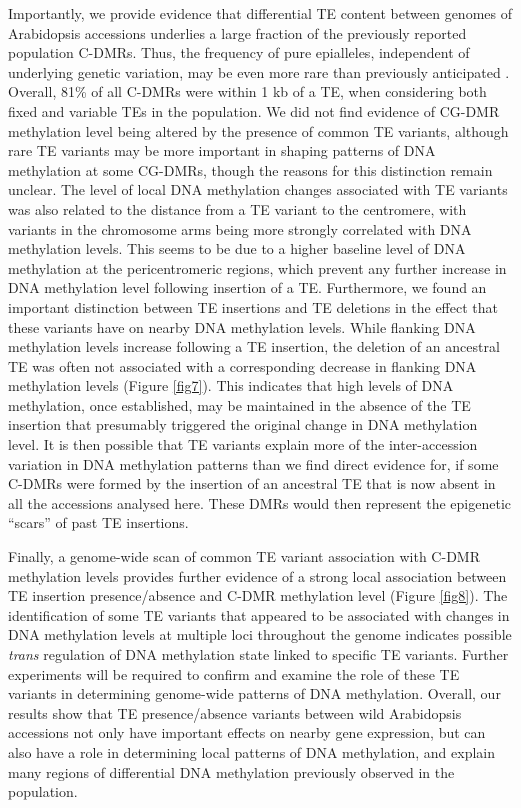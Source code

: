 \documentclass[12pt]{article}
\begin{document}
Importantly, we provide evidence that differential TE content between
genomes of Arabidopsis accessions underlies a large fraction of the
previously reported population C-DMRs. Thus, the frequency of pure
epialleles, independent of underlying genetic variation, may be even
more rare than previously anticipated \cite{Richards:2006br}. Overall,
81\% of all C-DMRs were within 1 kb of a TE, when considering both fixed
and variable TEs in the population. We did not find evidence of CG-DMR
methylation level being altered by the presence of common TE variants,
although rare TE variants may be more important in shaping patterns of
DNA methylation at some CG-DMRs, though the reasons for this distinction
remain unclear. The level of local DNA methylation changes associated
with TE variants was also related to the distance from a TE variant to
the centromere, with variants in the chromosome arms being more strongly
correlated with DNA methylation levels. This seems to be due to a higher
baseline level of DNA methylation at the pericentromeric regions, which
prevent any further increase in DNA methylation level following
insertion of a TE. Furthermore, we found an important distinction
between TE insertions and TE deletions in the effect that these variants
have on nearby DNA methylation levels. While flanking DNA methylation
levels increase following a TE insertion, the deletion of an ancestral
TE was often not associated with a corresponding decrease in flanking
DNA methylation levels (Figure \ref{fig7}). This indicates that high levels of
DNA methylation, once established, may be maintained in the absence of
the TE insertion that presumably triggered the original change in DNA
methylation level. It is then possible that TE variants explain more of
the inter-accession variation in DNA methylation patterns than we find
direct evidence for, if some C-DMRs were formed by the insertion of an
ancestral TE that is now absent in all the accessions analysed here.
These DMRs would then represent the epigenetic ``scars'' of past TE
insertions.

Finally, a genome-wide scan of common TE variant association with
C-DMR methylation levels provides further evidence of a strong local
association between TE insertion presence/absence and C-DMR
methylation level (Figure \ref{fig8}). The identification of some TE
variants that appeared to be associated with changes in DNA
methylation levels at multiple loci throughout the genome indicates
possible \emph{trans} regulation of DNA methylation state linked to
specific TE variants. Further experiments will be required to confirm
and examine the role of these TE variants in determining genome-wide
patterns of DNA methylation. Overall, our results show that TE
presence/absence variants between wild Arabidopsis accessions not only
have important effects on nearby gene expression, but can also have a
role in determining local patterns of DNA methylation, and explain
many regions of differential DNA methylation previously observed in
the population.
\end{document}
